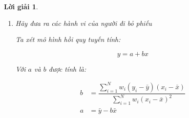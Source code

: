 \documentclass[14pt, a4paper]{article}
\theoremstyle{sltheorem}
\theoremstyle{soltheorem}
\newtheorem*{loigiai}{Lời giải}
\begin{document}
\begin{loigiai}
\begin{enumerate}
        Mối tương quan giữa thu nhập và số năm học của cử tri trong mẫu là 0.45, những cử tri có trình độ học vấn trên mức trung bình thường có thu nhập trên mức trung bình.
        Nhưng khi được tổng hợp theo khu vực bầu cử, mối tương quan giữa học vấn và thu nhập là 0.85

        Nghiên cứu đã sử dụng nhiều mô hình cho các mối quan hệ giữa tỷ lệ bỏ phiếu và đặc tính dân cư của khu vực.
        Nghiên cứu cũng xem xét mở rộng từ khu vực sang cá nhân.
        Một số mô hình được sử dụng trong nghiên cứu:

        \begin{itemize}
            \item Cực tiểu hóa bình phương có trọng Số
            \item Tỷ lệ ủng hộ cho các ứng cử viên
        \end{itemize}

        Nghiên cứu có xem xét qua ba giả định:

        \begin{itemize}
            \item Giả định chủng tộc: Mỗi người trong từng chủng tộc có xu hướng chọn cùng một ứng cử viên không liên quan đến khu vực sống.
            \item Giả định láng giếng: Những người trong cùng một khu vực có xu hướng chọn cùng một ứng cử viên không quan tâm đến chủng tộc.
            \item Giả định thu nhập: Những người ở cùng một mức thu nhập có xu hướng chọn cùng một ứng cử viên không quan tâm đến chủng tộc, khu vực sống
        \end{itemize}

        Với mỗi giả định, nghiên cứu ước lượng ra tỷ lệ ủng hộ các ứng viên theo từng giả định

        \item Hãy đưa ra các hành vi của người đi bỏ phiếu
        
        Ta xét mô hình hồi quy tuyến tính:

        \begin{equation} \label{eq:Linear_Regression}
            y = a + bx
        \end{equation}

        Với $a$ và $b$ được tính là:

        \begin{equation*}
            \begin{aligned}
                b &= \dfrac{\sum_{i=1}^N w_i (y_i - \bar{y})(x_i - \bar{x})}{\sum_{i=1}^N w_i (x_i - \bar{x})^2} \\
                a &= \bar{y} - b \bar{x}
            \end{aligned}
        \end{equation*}


\end{enumerate}
\end{loigiai}
\end{document}
